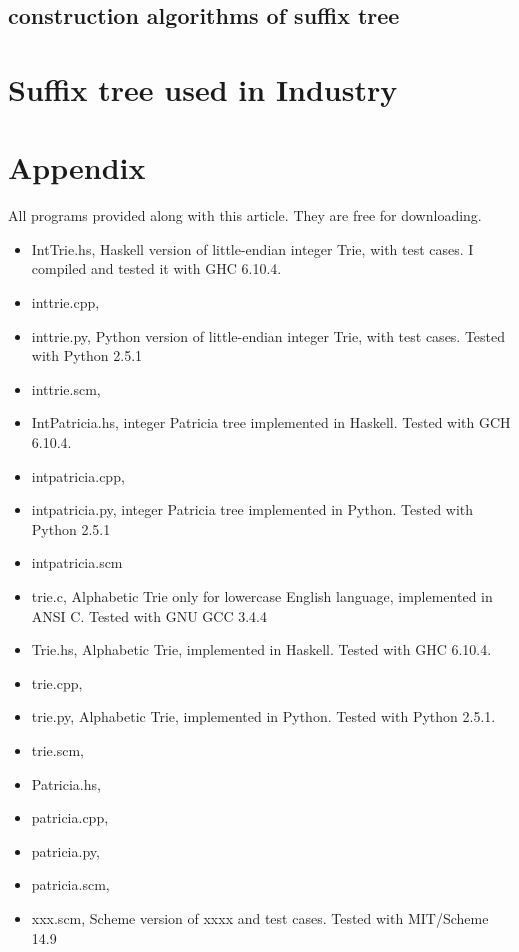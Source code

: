 \documentclass{article}
\begin{document}
\subsection{construction algorithms of suffix tree}

\section{Suffix tree used in Industry}

\section{Appendix} \label{appendix}
All programs provided along with this article. They are free for downloading.
\begin{itemize}
\item IntTrie.hs, Haskell version of little-endian integer Trie, with test cases. I compiled
and tested it with GHC 6.10.4.
\item inttrie.cpp,
\item inttrie.py, Python version of little-endian integer Trie, with test cases. Tested
with Python 2.5.1
\item inttrie.scm,
\item IntPatricia.hs, integer Patricia tree implemented in
Haskell. Tested with GCH 6.10.4. 
\item intpatricia.cpp,
\item intpatricia.py, integer Patricia tree implemented in
Python. Tested with Python 2.5.1
\item intpatricia.scm
\item trie.c, Alphabetic Trie only for lowercase English language,
implemented in ANSI C. Tested with GNU GCC 3.4.4
\item Trie.hs, Alphabetic Trie, implemented in Haskell. Tested with
GHC 6.10.4.
\item trie.cpp,
\item trie.py, Alphabetic Trie, implemented in Python. Tested with
Python 2.5.1.
\item trie.scm,
\item Patricia.hs,
\item patricia.cpp,
\item patricia.py,
\item patricia.scm,
\item xxx.scm, Scheme version of xxxx and test cases. Tested
with MIT/Scheme 14.9
\end{itemize}
\end{document}
